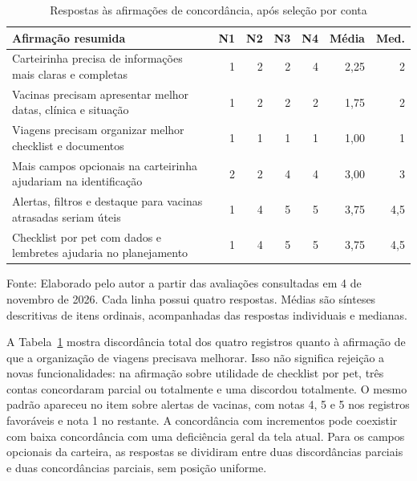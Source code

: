 \documentclass{UNESC}
\begin{document}
\begin{table}[htbp]
\centering
\caption{Respostas às afirmações de concordância, após seleção por conta}
\label{tab:likert_novembro}
\small
\setlength{\tabcolsep}{4pt}
\renewcommand{\arraystretch}{1.15}
\begin{tabular}{@{}p{}rrrrrr@{}}
\hline
\textbf{Afirmação resumida} & \textbf{N1} & \textbf{N2} & \textbf{N3} & \textbf{N4} & \textbf{Média} & \textbf{Med.} \\
\hline
Carteirinha precisa de informações mais claras e completas & 1 & 2 & 2 & 4 & 2,25 & 2 \\
Vacinas precisam apresentar melhor datas, clínica e situação & 1 & 2 & 2 & 2 & 1,75 & 2 \\
Viagens precisam organizar melhor checklist e documentos & 1 & 1 & 1 & 1 & 1,00 & 1 \\
Mais campos opcionais na carteirinha ajudariam na identificação & 2 & 2 & 4 & 4 & 3,00 & 3 \\
Alertas, filtros e destaque para vacinas atrasadas seriam úteis & 1 & 4 & 5 & 5 & 3,75 & 4,5 \\
Checklist por pet com dados e lembretes ajudaria no planejamento & 1 & 4 & 5 & 5 & 3,75 & 4,5 \\
\hline
\end{tabular}
\par\vspace{2pt}
{\footnotesize\raggedright Fonte: Elaborado pelo autor a partir das avaliações consultadas em 4 de novembro de 2026. Cada linha possui quatro respostas. Médias são sínteses descritivas de itens ordinais, acompanhadas das respostas individuais e medianas.\par}
\end{table}

A Tabela~\ref{tab:likert_novembro} mostra discordância total dos quatro registros quanto à afirmação de que a organização de viagens precisava melhorar. Isso não significa rejeição a novas funcionalidades: na afirmação sobre utilidade de checklist por pet, três contas concordaram parcial ou totalmente e uma discordou totalmente. O mesmo padrão apareceu no item sobre alertas de vacinas, com notas 4, 5 e 5 nos registros favoráveis e nota 1 no restante. A concordância com incrementos pode coexistir com baixa concordância com uma deficiência geral da tela atual. Para os campos opcionais da carteira, as respostas se dividiram entre duas discordâncias parciais e duas concordâncias parciais, sem posição uniforme.
\end{document}
